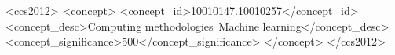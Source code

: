 \documentclass[sigplan,screen]{acmart}
\begin{document}
\begin{CCSXML}
<ccs2012>
   <concept>
       <concept_id>10010147.10010257</concept_id>
       <concept_desc>Computing methodologies~Machine learning</concept_desc>
       <concept_significance>500</concept_significance>
       </concept>
 </ccs2012>
\end{CCSXML}


\maketitle














\newpage

\balance

\end{document}
